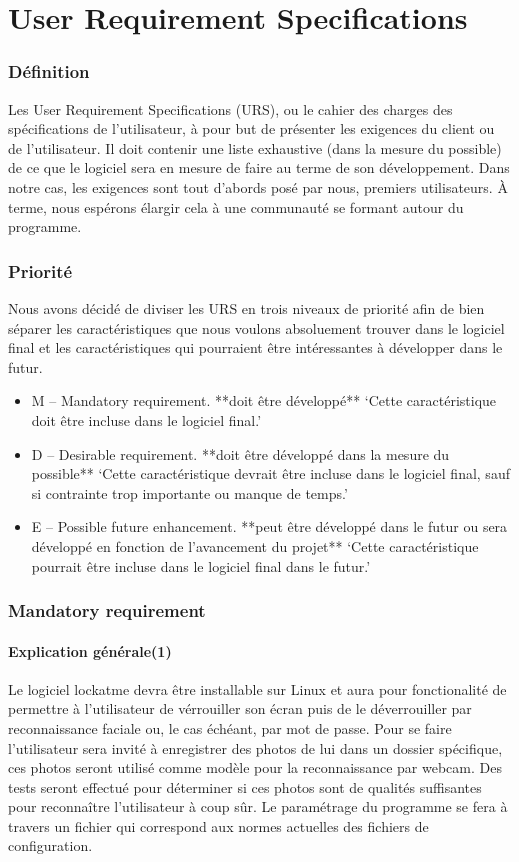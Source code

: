\part{User Requirement Specifications}
\section{Définition}
Les User Requirement Specifications (URS), ou le cahier des charges des
spécifications de l’utilisateur, à pour but de présenter les exigences du
client ou de l’utilisateur. Il doit contenir une liste exhaustive
(dans la mesure du possible) de ce que le logiciel sera en mesure de faire au
terme de son développement. Dans notre cas, les exigences sont tout d’abords
posé par nous, premiers utilisateurs. À terme, nous espérons élargir cela à
une communauté se formant autour du programme.

\section{Priorité}
Nous avons décidé de diviser les URS en trois niveaux de priorité afin de bien
séparer les caractéristiques que nous voulons absoluement trouver dans le
logiciel final et les caractéristiques qui pourraient être intéressantes à
développer dans le futur.
\begin{itemize}
  \item{M – Mandatory requirement. **doit être développé**
‘Cette caractéristique doit être incluse dans le logiciel final.’}
  \item{D – Desirable requirement. **doit être développé dans la mesure du
  possible**
‘Cette caractéristique devrait être incluse dans le logiciel final, sauf si
contrainte trop importante ou manque de temps.’}
  \item{E – Possible future enhancement. **peut être développé dans le futur
  ou sera développé en fonction de l’avancement du projet**
‘Cette caractéristique pourrait être incluse dans le logiciel final dans le
futur.’}
\end{itemize}

\section{Mandatory requirement}
  \subsection{Explication générale(1)}
Le logiciel lockatme devra être installable sur Linux et aura pour
fonctionalité de permettre à l’utilisateur de vérrouiller son écran puis de
le déverrouiller par reconnaissance faciale ou, le cas échéant, par mot de
passe. Pour se faire l’utilisateur sera invité à enregistrer des photos de
lui dans un dossier spécifique, ces photos seront utilisé comme modèle pour la
reconnaissance par webcam. Des tests seront effectué pour déterminer si ces
photos sont de qualités suffisantes pour reconnaître l’utilisateur à coup sûr.
Le paramétrage du programme se fera à travers un fichier qui correspond aux
normes actuelles des fichiers de configuration.

